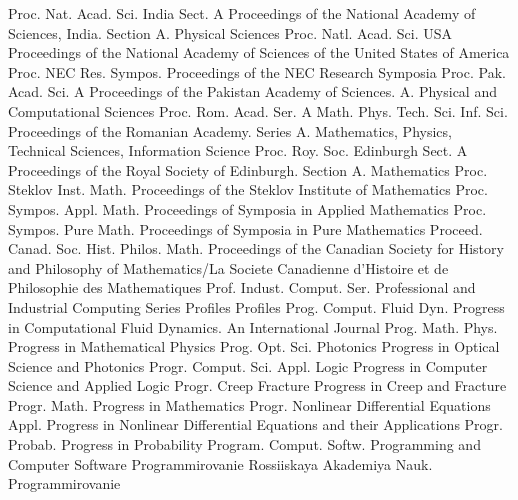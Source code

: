 {Proc. Nat. Acad. Sci. India Sect. A}
{Proceedings of the National Academy of Sciences, India. Section A. Physical Sciences}
{Proc. Natl. Acad. Sci. USA}
{Proceedings of the National Academy of Sciences of the United States of America}
{Proc. NEC Res. Sympos.}
{Proceedings of the NEC Research Symposia}
{Proc. Pak. Acad. Sci. A}
{Proceedings of the Pakistan Academy of Sciences. A. Physical and Computational Sciences}
{Proc. Rom. Acad. Ser. A Math. Phys. Tech. Sci. Inf. Sci.}
{Proceedings of the Romanian Academy. Series A. Mathematics, Physics, Technical Sciences, Information Science}
{Proc. Roy. Soc. Edinburgh Sect. A}
{Proceedings of the Royal Society of Edinburgh. Section A. Mathematics}
{Proc. Steklov Inst. Math.}
{Proceedings of the Steklov Institute of Mathematics}
{Proc. Sympos. Appl. Math.}
{Proceedings of Symposia in Applied Mathematics}
{Proc. Sympos. Pure Math.}
{Proceedings of Symposia in Pure Mathematics}
{Proceed. Canad. Soc. Hist. Philos. Math.}
{Proceedings of the Canadian Society for History and Philosophy of Mathematics/La Societe Canadienne d'Histoire et de Philosophie des Mathematiques}
{Prof. Indust. Comput. Ser.}
{Professional and Industrial Computing Series}
{Profiles}
{Profiles}
{Prog. Comput. Fluid Dyn.}
{Progress in Computational Fluid Dynamics. An International Journal}
{Prog. Math. Phys.}
{Progress in Mathematical Physics}
{Prog. Opt. Sci. Photonics}
{Progress in Optical Science and Photonics}
{Progr. Comput. Sci. Appl. Logic}
{Progress in Computer Science and Applied Logic}
{Progr. Creep Fracture}
{Progress in Creep and Fracture}
{Progr. Math.}
{Progress in Mathematics}
{Progr. Nonlinear Differential Equations Appl.}
{Progress in Nonlinear Differential Equations and their Applications}
{Progr. Probab.}
{Progress in Probability}
{Program. Comput. Softw.}
{Programming and Computer Software}
{Programmirovanie}
{Rossiiskaya Akademiya Nauk. Programmirovanie}
